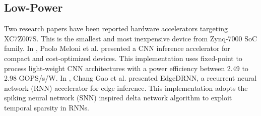 \subsection{Low-Power}
Two research papers have been reported hardware accelerators targeting XC7Z007S. This is the smallest and most inexpensive device from Zynq-7000 SoC family. In \cite{meloni2019cnn}, Paolo Meloni et al. presented a CNN inference accelerator for compact and cost-optimized devices. This implementation uses fixed-point to process light-weight CNN architectures with a power efficiency between 2.49 to 2.98 GOPS/s/W. In \cite{gao2020edgedrnn}, Chang Gao et al. presented EdgeDRNN, a recurrent neural network (RNN) accelerator for edge inference. This implementation adopts the spiking neural network (SNN) inspired delta network algorithm to exploit temporal sparsity in RNNs.